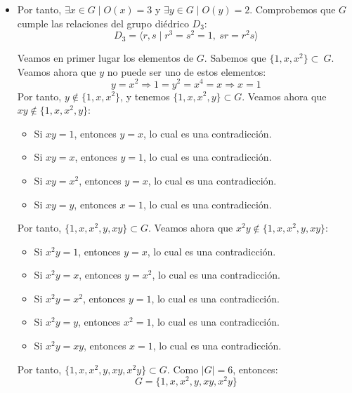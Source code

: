 \begin{ejercicio}
\begin{enumerate}
\begin{itemize}
\begin{itemize}
                \item Por tanto, $\exists x\in G\mid O(x)=3$ y $\exists y\in G\mid O(y)=2$. Comprobemos que $G$ cumple las relaciones del grupo diédrico $D_3$:
                \begin{equation*}
                    D_3 = \langle r,s\mid r^3=s^2=1,\ sr=r^2s\rangle
                \end{equation*}

                Veamos en primer lugar los elementos de $G$. Sabemos que $\{1,x,x^2\}\subset~G$. Veamos ahora que $y$ no puede ser uno de estos elementos:
                \begin{equation*}
                    y=x^2\Longrightarrow 1=y^2=x^4=x\Longrightarrow x=1
                \end{equation*}
                Por tanto, $y\notin \{1,x,x^2\}$, y tenemos $\{1,x,x^2,y\}\subset G$. Veamos ahora que $xy\notin \{1,x,x^2,y\}$:
                \begin{itemize}
                    \item Si $xy=1$, entonces $y=x$, lo cual es una contradicción.
                    \item Si $xy=x$, entonces $y=1$, lo cual es una contradicción.
                    \item Si $xy=x^2$, entonces $y=x$, lo cual es una contradicción.
                    \item Si $xy=y$, entonces $x=1$, lo cual es una contradicción.
                \end{itemize}

                Por tanto, $\{1,x,x^2,y,xy\}\subset G$. Veamos ahora que $x^2y\notin \{1,x,x^2,y,xy\}$:
                \begin{itemize}
                    \item Si $x^2y=1$, entonces $y=x$, lo cual es una contradicción.
                    \item Si $x^2y=x$, entonces $y=x^2$, lo cual es una contradicción.
                    \item Si $x^2y=x^2$, entonces $y=1$, lo cual es una contradicción.
                    \item Si $x^2y=y$, entonces $x^2=1$, lo cual es una contradicción.
                    \item Si $x^2y=xy$, entonces $x=1$, lo cual es una contradicción.
                \end{itemize}

                Por tanto, $\{1,x,x^2,y,xy,x^2y\}\subset G$. Como $|G|=6$, entonces:
                \begin{equation*}
                    G=\{1,x,x^2,y,xy,x^2y\}
                \end{equation*}


\end{itemize}
\end{itemize}
\end{enumerate}
\end{ejercicio}

